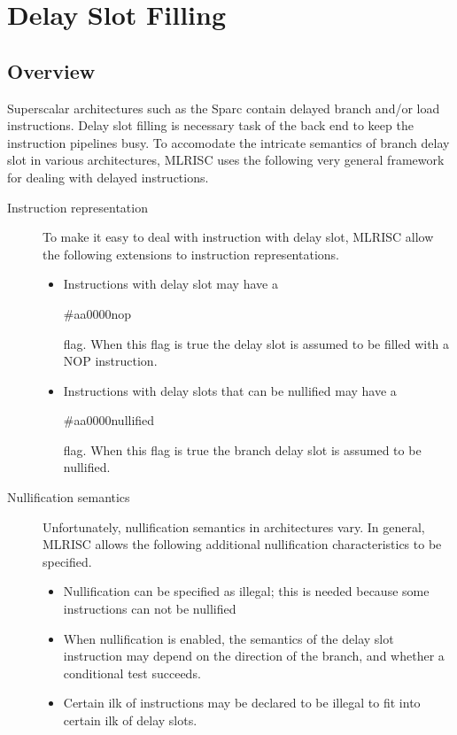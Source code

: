 \section{Delay Slot Filling}
\subsection{ Overview }

    Superscalar architectures such as the Sparc
contain delayed branch and/or load instructions.  
Delay slot filling is necessary 
task of the back end to keep the instruction pipelines busy.  To accomodate
the intricate semantics of branch delay slot in various architectures, 
MLRISC uses the following very general framework for dealing with 
delayed instructions. 
   
\begin{description}
  \item[Instruction representation]
      To make it easy to deal with instruction with delay slot, MLRISC allow
       the following extensions to instruction representations.
  \begin{itemize}
    \item Instructions with delay slot may have a
        \begin{color}{#aa0000}nop\end{color} flag.   When this flag is true
        the delay slot is assumed to be filled with a NOP instruction.
    \item Instructions with delay slots that can be nullified may have a
        \begin{color}{#aa0000}nullified\end{color} flag.   
       When this flag is true the branch delay slot is assumed to be
       nullified.  
    \end{itemize}
   \item[Nullification semantics]
     Unfortunately, nullification semantics
        in architectures vary. In general, MLRISC allows the following
        additional nullification characteristics to be specified. 
     \begin{itemize}
     \item Nullification can be specified as illegal; this is needed 
           because some instructions can not be nullified
     \item When nullification is enabled, the semantics of the delay slot
          instruction may depend on the direction of the branch, and whether
          a conditional test succeeds. 
     \item Certain ilk of instructions may be declared to be illegal
          to fit into certain ilk of delay slots.
     \end{itemize}
\end{description} 

